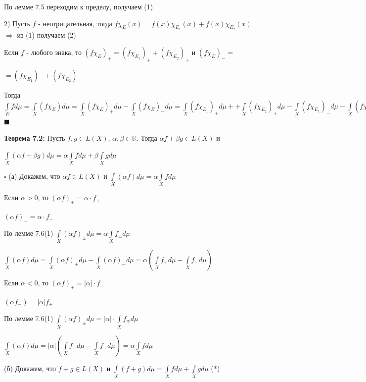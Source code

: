 \documentclass[a4paper]{report}
\begin{document}
По лемме 7.5 переходим к пределу, получаем (1)

2) Пусть $f$ - неотрицательная, тогда $f\chi_E(x)=f(x)\chi_{E_1}(x)+f(x)\chi_{E_2}(x)$ $\Rightarrow$ из (1) получаем (2)

Если $f$ - любого знака, то $(f\chi_E)_+=(f\chi_{E_1})_++(f\chi_{E_2})_+$ и $(f\chi_E)_-=$

\noindent $=(f\chi_{E_1})_-+(f\chi_{E_2})_-$

Тогда $\displaystyle\int\limits_E fd\mu=\displaystyle\int\limits_X(f\chi_E)d\mu=\displaystyle\int\limits_X(f\chi_E)_+d\mu-\displaystyle\int\limits_X(f\chi_E)_-d\mu=\displaystyle\int\limits_X(f\chi_{E_1})_+d\mu++\displaystyle\int\limits_X
(f\chi_{E_2})_+d\mu-\displaystyle\int\limits_X(f\chi_{E_1})_-d\mu-\displaystyle\int\limits_X(f\chi_{E_2})_-d\mu=\displaystyle\int\limits_{E_1}fd\mu+\displaystyle\int\limits_{E_2}fd\mu$ $\blacksquare$
\bigskip

\noindent\textbf{Теорема 7.2:} Пусть $f,g\in L(X)$, $\alpha,\beta\in\mathbb R$. Тогда $\alpha f+\beta g\in L(X)$ и

\noindent $\displaystyle\int\limits_X(\alpha f+\beta g)d\mu=\alpha\displaystyle\int\limits_Xfd\mu+\beta\displaystyle\int\limits_X gd\mu$

\noindent $\square$ (а) Докажем, что $\alpha f\in L(X)$ и $\displaystyle\int\limits_X(\alpha f)d\mu=\alpha\displaystyle\int\limits_X fd\mu$

Если $\alpha>0$, то $(\alpha f)_+=\alpha\cdot f_+$

$(\alpha f)_-=\alpha\cdot f_-$

По лемме 7.6(1) $\displaystyle\int\limits_X(\alpha f)_\pm d\mu=\alpha\displaystyle\int\limits_Xf_\pm d\mu$

$\displaystyle\int\limits_X (\alpha f)d\mu=\displaystyle\int\limits_X(\alpha f)_+d\mu-\displaystyle\int\limits_X(\alpha f)_-d\mu=\alpha(\displaystyle\int\limits_Xf_+d\mu-\displaystyle\int\limits_Xf_-d\mu)$

Если $\alpha<0$, то $(\alpha f)_+=|\alpha|\cdot f_-$

$(\alpha f_-)=|\alpha|f_+$

По лемме 7.6(1) $\displaystyle\int\limits_X(\alpha f)_\pm d\mu=|\alpha|\cdot\displaystyle\int\limits_X f_\mp d\mu$

$\displaystyle\int\limits_X(\alpha f)d\mu=|\alpha|(\displaystyle\int\limits_X f_-d\mu-\displaystyle\int\limits_X f_+d\mu)=\alpha\displaystyle\int\limits_X fd\mu$

(б) Докажем, что $f+g\in L(X)$ и $\displaystyle\int\limits_X(f+g)d\mu=\displaystyle\int\limits_X fd\mu+\displaystyle\int\limits_X gd\mu$  (*)
\end{document}
